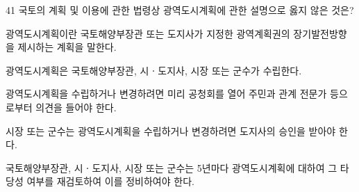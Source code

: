 \begin{question}{41}
국토의 계획 및 이용에 관한 법령상 광역도시계획에 관한 설명으로 옳지 않은 것은?
\begin{choices}
  \item 광역도시계획이란 국토해양부장관 또는 도지사가 지정한 광역계획권의 장기발전방향을 제시하는 계획을 말한다.
  \item 광역도시계획은 국토해양부장관, 시ㆍ도지사, 시장 또는 군수가 수립한다.
  \item 광역도시계획을 수립하거나 변경하려면 미리 공청회를 열어 주민과 관계 전문가 등으로부터 의견을 들어야 한다.
  \item 시장 또는 군수는 광역도시계획을 수립하거나 변경하려면 도지사의 승인을 받아야 한다.
  \item 국토해양부장관, 시ㆍ도지사, 시장 또는 군수는 5년마다 광역도시계획에 대하여 그 타당성 여부를 재검토하여 이를 정비하여야 한다.
\end{choices}
\end{question}
